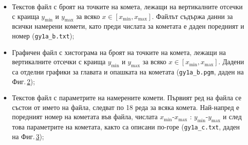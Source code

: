 \documentclass[12pt]{article}
\begin{document}
\begin{itemize}
\begin{figure}[b]
  \caption{}
  \label{Fig1}
\end{figure}
\item
 Текстов файл с броят на точките на комета, лежащи на вертикалните
 отсечки с краища $y_{\min}$ и $y_{\max}$ за всяко $x \in [x_{\min},
 x_{\max}]$. Файлът съдържа данни за всички намерени комети, като преди
 числата за кометата е даден поредният и номер\linebreak
 (\verb|gy1a_b.txt|);
\item
 Графичен файл с хистограма на броят на точките на комета, лежащи на вертикалните
 отсечки с краища $y_{\min}$ и $y_{\max}$ за всяко $x \in [x_{\min},
 x_{\max}]$. Дадени са отделни графики за главата и опашката на
 кометата (\verb|gy1a_b.pgm|, даден на Фиг.\,\ref{Fig3});
 \begin{figure}[b]
     \caption{}
  \label{Fig3}
\end{figure}
\item
 Текстов файл с параметрите на намерените комети. Първият ред
 на файла се състои от името на файла, следват по 18 реда за всяка
 комета. Най-напред е поредният номер на кометата във файла, числата
 $x_{\min}$-$x_{\max}$ : $y_{\min}$-$y_{\max}$ и след това
 параметрите на кометата, както са описани по-горе
 (\verb|gy1a_c.txt|, даден на Фиг.\,\ref{Fig2});
 \begin{figure}[t]
 \caption{}
 \label{Fig2}
\end{figure}
\end{itemize}
\end{document}
